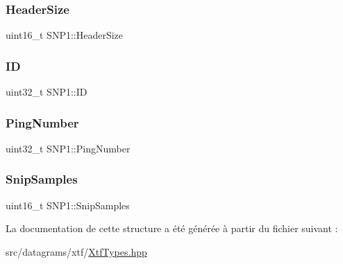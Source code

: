 \mbox{\label{structSNP1_adbfcf4adc5b40b66c93b6ba29614e676}} 
\subsubsection{\texorpdfstring{Header\+Size}{HeaderSize}}
{\footnotesize\ttfamily uint16\+\_\+t S\+N\+P1\+::\+Header\+Size}

\mbox{\label{structSNP1_ae831f0f3db4684dc376a024baeb78177}} 
\subsubsection{\texorpdfstring{ID}{ID}}
{\footnotesize\ttfamily uint32\+\_\+t S\+N\+P1\+::\+ID}

\mbox{\label{structSNP1_acf218e8c904b3fd1070a2d1953fbab97}} 
\subsubsection{\texorpdfstring{Ping\+Number}{PingNumber}}
{\footnotesize\ttfamily uint32\+\_\+t S\+N\+P1\+::\+Ping\+Number}

\mbox{\label{structSNP1_a56b038e82536d0cd2f6f65dac10b76aa}} 
\subsubsection{\texorpdfstring{Snip\+Samples}{SnipSamples}}
{\footnotesize\ttfamily uint16\+\_\+t S\+N\+P1\+::\+Snip\+Samples}



La documentation de cette structure a été générée à partir du fichier suivant \+:\begin{DoxyCompactItemize}
\item 
src/datagrams/xtf/\hyperlink{XtfTypes_8hpp}{Xtf\+Types.\+hpp}\end{DoxyCompactItemize}
